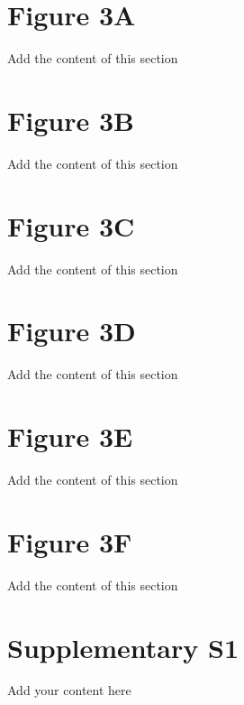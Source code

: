 \documentclass[10pt]{article}         %
\begin{document}
\newpage
\section{Figure 3A}
Add the content of this section

\newpage
\section{Figure 3B}
Add the content of this section

\newpage
\section{Figure 3C}
Add the content of this section

\newpage
\section{Figure 3D}
Add the content of this section

\newpage
\section{Figure 3E}
Add the content of this section

\newpage
\section{Figure 3F}
Add the content of this section

\newpage
\section{Supplementary S1}
Add your content here\\

\newpage
\end{document}

